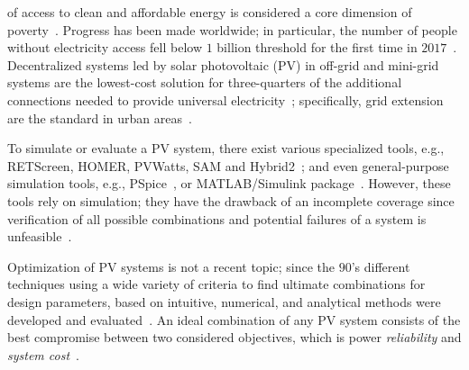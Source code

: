 \documentclass[journal]{IEEEtran}
\begin{document}

 of access to clean and affordable energy is considered a core dimension of poverty~\cite{Hussein2012}. Progress has been made worldwide; in particular, the number of people without electricity access fell below $1$ billion threshold for the first time in $2017$~\cite{IEAweo2018}. Decentralized systems led by solar photovoltaic (PV) in off-grid and mini-grid systems are the lowest-cost solution for three-quarters of the additional connections needed to provide universal electricity~\cite{Hussein2012}; specifically, grid extension are the standard in urban areas~\cite{IEAweo2018}.

To simulate or evaluate a PV system, there exist various specialized tools, e.g., RETScreen, HOMER, PVWatts, SAM and Hybrid2~\cite{Pradhan,Swarnkar,NRELDobos,NRELBlair,Mills}; and even general-purpose simulation tools, e.g., PSpice~\cite{Gow1999}, or MATLAB/Simulink package~\cite{Benatiallah2017}. However, these tools rely on simulation; they have the drawback of an incomplete coverage since verification of all possible combinations and potential failures of a system is unfeasible~\cite{ClarkeHV18}. 

Optimization of PV systems is not a recent topic; since the $90$'s different techniques using a wide variety of criteria to find ultimate combinations for design parameters, based on intuitive, numerical, and analytical methods were developed and evaluated~\cite{Applasamy2011}. An ideal combination of any PV system consists of the best compromise between two considered objectives, which is power \textit{reliability} and \textit{system cost}~\cite{Alsadi2018}.
\end{document}
